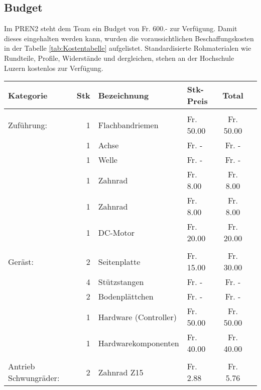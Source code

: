 \subsection{Budget}
	Im PREN2 steht dem Team ein Budget von Fr. 600.- zur Verfügung. Damit 
	dieses eingehalten werden kann, wurden die voraussichtlichen 
	Beschaffungskosten in der Tabelle \ref{tab:Kostentabelle} aufgelistet. 
	Standardisierte Rohmaterialen wie Rundteile, Profile, Widerstände und 
	dergleichen, stehen an der Hochschule Luzern kostenlos zur Verfügung.
    \begin{longtable}{p{1.7cm}rllcc}
    \textbf{Kategorie} & \textbf{Stk} & \textbf{Bezeichnung} & \textbf{Stk-Preis}
    & \textbf{Total} \\
    \hline     &       &                              &            &            \\
    Zuführung: & 1     & Flachbandriemen 	          &  Fr. 50.00 &  Fr. 50.00 \\
               & 1     & Achse          	          &  Fr. -     &  Fr. -     \\
               & 1     & Welle                     	  &  Fr. -     &  Fr. -     \\
               & 1     & Zahnrad         	          &  Fr. 8.00  &  Fr. 8.00  \\
               & 1     & Zahnrad         	          &  Fr. 8.00  &  Fr. 8.00  \\
               & 1     & DC-Motor        	          &  Fr. 20.00 &  Fr. 20.00 \\
               &       &                 	          &            &            \\
       Geräst: & 2     & Seitenplatte    	          &  Fr. 15.00 &  Fr. 30.00 \\
               & 4     & Stützstangen    	          &  Fr. -     &  Fr. -     \\
               & 2     & Bodenplättchen  	          &  Fr. -     &  Fr. -     \\
               & 1     & Hardware (Controller)        &  Fr. 50.00 &  Fr. 50.00 \\
               & 1     & Hardwarekomponenten          &  Fr. 40.00 &  Fr. 40.00 \\
               &       &       				          &      	   &            \\
   \multirow{3}{1.7cm}{Antrieb Schwungräder:}  
               & 2     & Zahnrad Z15                  &  Fr. 2.88  &  Fr. 5.76  \\

\end{longtable}
